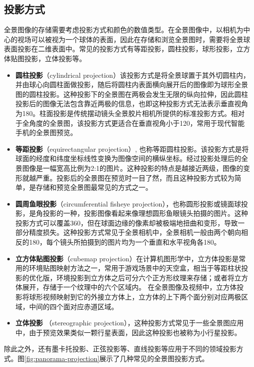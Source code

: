 \subsection{投影方式}
全景图像的存储需要考虑投影方式和颜色的数值类型。在全景图像中，以相机为中心的视场可以被视为一个球体的表面，因此在存储和浏览全景图时，需要将全景球表面投影在二维表面中。常见的投影方式有等距投影，圆柱投影，球形投影，立方体贴图投影，立体投影等。
\begin{itemize}
\item \textbf{圆柱投影}（cylindrical projection）该投影方式是将全景球置于其外切圆柱内，并由球心向圆柱面做投影，随后将圆柱内表面横向展开后的图像即为球形全景图的圆柱投影。这种投影下的全景图在两极会发生无限的纵向拉伸，因此圆柱投影后的图像无法包含靠近两极的信息，也即这种投影方式无法表示垂直视角为180。柱面投影是传统摆动镜头全景胶片相机所提供的标准投影方式。相对于全角度的全景图，该投影方式更适合在垂直视角小于120，常用于现代智能手机的全景图预览。
\item \textbf{等距投影}（equirectangular projection）, 也称等距圆柱投影。该投影方式是将球面的经度和纬度坐标线性变换为图像空间的横纵坐标。经过投影处理后的全景图像是一幅宽高比例为2:1的图片。这种投影的特点是越接近两级，图像的变形就越严重。投影后的全景图在预览时一目了然，而且这种投影方式较为简单，是存储和预览全景图最常见的方式之一。
\item \textbf{圆周鱼眼投影}（circumferential fisheye projection），也称圆形投影或镜面球投影，是角投影的一种，投影图像看起来像理想圆形鱼眼镜头拍摄的图片。这种投影方式可以覆盖360，但在球面边缘的像素却被极端地扭曲和变形，导致一部分精度损失。这种投影方式常见于全景相机中，全景相机一般由两个朝向相反的180，每个镜头所拍摄到的图片均为一个垂直和水平视角各180。
\item \textbf{立方体贴图投影}（cubemap projection）在计算机图形学中，立方体投影是常用的环境贴图映射方法之一，常用于游戏场景中的天空盒，相当于等距柱状投影的优化版，环境投影到立方体之后可分六个正方形纹理来存储；或者将立方体展开，存储于一个纹理中的六个区域内。 
在全景图像及视频中，立方体投影将球形视频映射到它的外接立方体上，立方体的上下两个面分别对应两极区域，中间的四个面对应赤道区域。
\item \textbf{立体投影} （stereographic projection），这种投影方式常见于一些全景图应用中，由于预览效果类似一颗行星表面，因此这种投影也被称为小行星投影。
\end{itemize}

除此之外，还有墨卡托投影、正弦投影等、直线投影等应用于不同的领域投影方式。图\ref{fig:panorama-projection}展示了几种常见的全景图投影方式。


